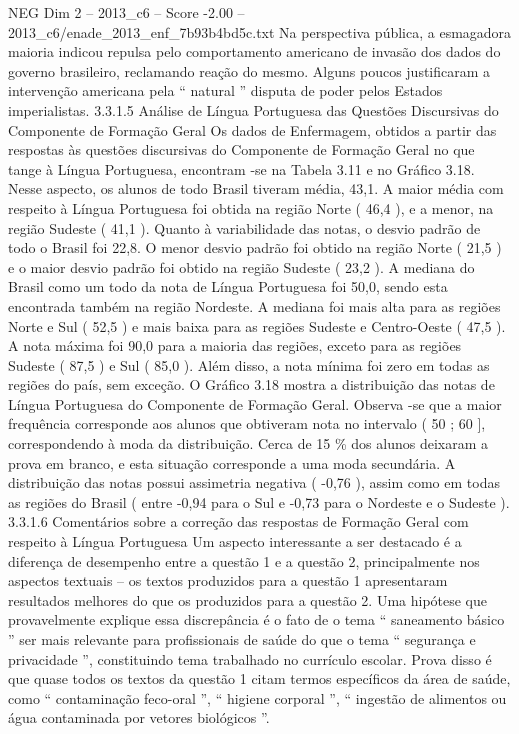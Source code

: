 \begin{textsample}{NEG Dim 2 – 2013\_c6 – Score -2.00 – 2013\_c6/enade\_2013\_enf\_7b93b4bd5c.txt}
Na perspectiva pública, a esmagadora maioria indicou repulsa pelo comportamento americano de invasão dos dados do governo brasileiro, reclamando reação do mesmo.
Alguns poucos justificaram a intervenção americana pela “ natural ” disputa de poder pelos Estados imperialistas. 3.3.1.5 Análise de Língua Portuguesa das Questões Discursivas do Componente de Formação Geral Os dados de Enfermagem, obtidos a partir das respostas às questões discursivas do Componente de Formação Geral no que tange à Língua Portuguesa, encontram -se na Tabela 3.11 e no Gráfico 3.18.
Nesse aspecto, os alunos de todo Brasil tiveram média, 43,1.
A maior média com respeito à Língua Portuguesa foi obtida na região Norte ( 46,4 ), e a menor, na região Sudeste ( 41,1 ).
Quanto à variabilidade das notas, o desvio padrão de todo o Brasil foi 22,8.
O menor desvio padrão foi obtido na região Norte ( 21,5 ) e o maior desvio padrão foi obtido na região Sudeste ( 23,2 ).
A mediana do Brasil como um todo da nota de Língua Portuguesa foi 50,0, sendo esta encontrada também na região Nordeste.
A mediana foi mais alta para as regiões Norte e Sul ( 52,5 ) e mais baixa para as regiões Sudeste e Centro-Oeste ( 47,5 ).
A nota máxima foi 90,0 para a maioria das regiões, exceto para as regiões Sudeste ( 87,5 ) e Sul ( 85,0 ).
Além disso, a nota mínima foi zero em todas as regiões do país, sem exceção.
O Gráfico 3.18 mostra a distribuição das notas de Língua Portuguesa do Componente de Formação Geral.
Observa -se que a maior frequência corresponde aos alunos que obtiveram nota no intervalo ( 50 ; 60 ], correspondendo à moda da distribuição.
Cerca de 15 \% dos alunos deixaram a prova em branco, e esta situação corresponde a uma moda secundária.
A distribuição das notas possui assimetria negativa ( -0,76 ), assim como em todas as regiões do Brasil ( entre -0,94 para o Sul e -0,73 para o Nordeste e o Sudeste ). 3.3.1.6 Comentários sobre a correção das respostas de Formação Geral com respeito à Língua Portuguesa Um aspecto interessante a ser destacado é a diferença de desempenho entre a questão 1 e a questão 2, principalmente nos aspectos textuais – os textos produzidos para a questão 1 apresentaram resultados melhores do que os produzidos para a questão 2.
Uma hipótese que provavelmente explique essa discrepância é o fato de o tema “ saneamento básico ” ser mais relevante para profissionais de saúde do que o tema “ segurança e privacidade ”, constituindo tema trabalhado no currículo escolar.
Prova disso é que quase todos os textos da questão 1 citam termos específicos da área de saúde, como “ contaminação feco-oral ”, “ higiene corporal ”, “ ingestão de alimentos ou água contaminada por vetores biológicos ”.

\end{textsample}
